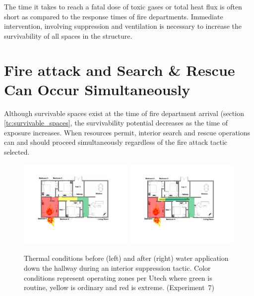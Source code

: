 \documentclass[12pt,oneside]{book}
\begin{document}
The time it takes to reach a fatal dose of toxic gases or total heat flux is often short as compared to the response times of fire departments. Immediate intervention, involving suppression and ventilation is necessary to increase the survivability of all spaces in the structure. 

\section{Fire attack and Search \& Rescue Can Occur Simultaneously} \label{tc:search_during_fire_attack}
Although survivable spaces exist at the time of fire department arrival (section \ref{tc:survivable_spaces}, the survivability potential decreases as the time of exposure increases. When resources permit, interior search and rescue operations can and should proceed simultaneously regardless of the fire attack tactic selected.

\begin{figure}[H]
\centering
\includegraphics[width=0.495\textwidth]{../0_Images/Tactical_Considerations/Similtanious_Search/Interior_Pre}
\includegraphics[width=0.49\textwidth]{../0_Images/Tactical_Considerations/Similtanious_Search/Interior_Post}
\caption[Thermal Conditions - Simultaneous Search - Interior]{Thermal conditions before (left) and after (right) water application down the hallway during an interior suppression tactic. Color conditions represent operating zones per Utech \cite{Utech_Firefighter_Clothing} where green is routine, yellow is ordinary and red is extreme. (Experiment~7)}
\label{fig:similatnious_search_tc_interior}
\end{figure}
\end{document}
